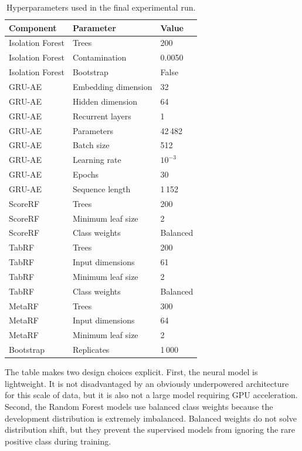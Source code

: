 \documentclass[10pt,journal,compsoc]{IEEEtran}
\begin{document}
\begin{table}[t]
\centering
\caption{Hyperparameters used in the final experimental run.}
\label{tab:hyperparameters}
\begin{tabular}{lll}
\toprule
\textbf{Component} & \textbf{Parameter} & \textbf{Value} \\
\midrule
Isolation Forest & Trees & 200 \\
Isolation Forest & Contamination & 0.0050 \\
Isolation Forest & Bootstrap & False \\
GRU-AE & Embedding dimension & 32 \\
GRU-AE & Hidden dimension & 64 \\
GRU-AE & Recurrent layers & 1 \\
GRU-AE & Parameters & 42\,482 \\
GRU-AE & Batch size & 512 \\
GRU-AE & Learning rate & $10^{-3}$ \\
GRU-AE & Epochs & 30 \\
GRU-AE & Sequence length & 1\,152 \\
ScoreRF & Trees & 200 \\
ScoreRF & Minimum leaf size & 2 \\
ScoreRF & Class weights & Balanced \\
TabRF & Trees & 200 \\
TabRF & Input dimensions & 61 \\
TabRF & Minimum leaf size & 2 \\
TabRF & Class weights & Balanced \\
MetaRF & Trees & 300 \\
MetaRF & Input dimensions & 64 \\
MetaRF & Minimum leaf size & 2 \\
Bootstrap & Replicates & 1\,000 \\
\bottomrule
\end{tabular}
\end{table}

The table makes two design choices explicit. First, the neural model is lightweight. It is not disadvantaged by an obviously underpowered architecture for this scale of data, but it is also not a large model requiring GPU acceleration. Second, the Random Forest models use balanced class weights because the development distribution is extremely imbalanced. Balanced weights do not solve distribution shift, but they prevent the supervised models from ignoring the rare positive class during training.
\end{document}

